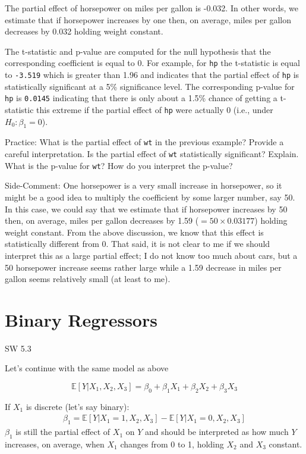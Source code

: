 \documentclass[
  letterpaper,
  DIV=11,
  numbers=noendperiod]{scrreprt}
\begin{document}
The partial effect of horsepower on miles per gallon is -0.032. In other
words, we estimate that if horsepower increases by one then, on average,
miles per gallon decreases by 0.032 holding weight constant.

The t-statistic and p-value are computed for the null hypothesis that
the corresponding coefficient is equal to 0. For example, for
\texttt{hp} the t-statistic is equal to \texttt{-3.519} which is greater
than 1.96 and indicates that the partial effect of \texttt{hp} is
statistically significant at a 5\% significance level. The corresponding
p-value for \texttt{hp} is \texttt{0.0145} indicating that there is only
about a 1.5\% chance of getting a t-statistic this extreme if the
partial effect of \texttt{hp} were actually 0 (i.e., under
\(H_0 : \beta_1=0\)).

{Practice: }What is the partial effect of \texttt{wt} in the previous
example? Provide a careful interpretation. Is the partial effect of
\texttt{wt} statistically significant? Explain. What is the p-value for
\texttt{wt}? How do you interpret the p-value?

{Side-Comment:} One horsepower is a very small increase in horsepower,
so it might be a good idea to multiply the coefficient by some larger
number, say 50. In this case, we could say that we estimate that if
horsepower increases by 50 then, on average, miles per gallon decreases
by 1.59 (\(=50 \times 0.03177\)) holding weight constant. From the above
discussion, we know that this effect is statistically different from 0.
That said, it is not clear to me if we should interpret this as a large
partial effect; I do not know too much about cars, but a 50 horsepower
increase seems rather large while a 1.59 decrease in miles per gallon
seems relatively small (at least to me).

\section{Binary Regressors}\label{binary-regressors}

SW 5.3

Let's continue with the same model as above

\[
  \mathbb{E}[Y|X_1,X_2,X_3] = \beta_0 + \beta_1 X_1 + \beta_2 X_2 + \beta_3 X_3
\]

If \(X_1\) is discrete (let's say binary): \begin{align*}
  \beta_1 = \mathbb{E}[Y|X_1=1,X_2,X_3] - \mathbb{E}[Y|X_1=0,X_2,X_3]
\end{align*} \(\beta_1\) is still the partial effect of \(X_1\) on \(Y\)
and should be interpreted as how much \(Y\) increases, on average, when
\(X_1\) changes from 0 to 1, holding \(X_2\) and \(X_3\) constant.
\end{document}
